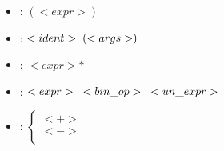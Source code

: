 \documentclass[12pt, a4paper]{article}
\begin{document}
\begin{itemize}
    \item{}
    :\hspace{\spacefromdefn}
    $(<expr>)$

    \item{}
    :\hspace{\spacefromdefn}
    $<ident> \hspace{1mm} (<args>)$

    \item{}
    :\hspace{\spacefromdefn}
    $<expr>*$

    \item{}
    :\hspace{\spacefromdefn}
    $<expr> \hspace{3mm} <bin\_op> \hspace{3mm} <un\_expr>$

    \item{}
    :\hspace{\spacefromdefn}
    \begin{math}
        \begin{cases}
            <+> \\
            <-> \\
        \end{cases}
    \end{math}
\end{itemize}
\end{document}

